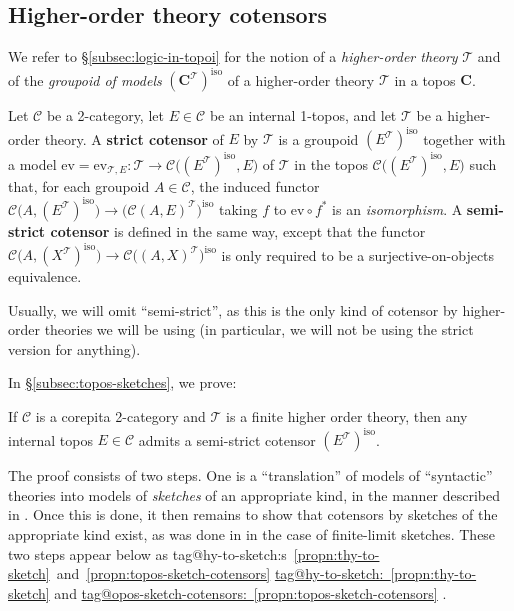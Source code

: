 \documentclass{amsart}
\makeatletter
\newcommand\bC{\mathbf{C}}
\newcommand\cC{\mathcal{C}}
\newcommand\cT{\mathcal{T}}
\newcommand\defword[1]{{\boldmath \textbf{#1}}}
\newcommand\ev{\mathrm{ev}}
\newcommand\iso{\mathrm{iso}}
\newcommand\pbig[1]{\big({#1}\big)}
\newcommand\tagword[1]{\csname tag@#1\endcsname}
\def\label@tag#1:#2\@nil{#1}
\newcommand\labeltag[1]{\label@tag#1:\@nil}
\newcommand\jref[1]{%
  \texorpdfstring%
    {\hyperref[#1]{\tagword{\labeltag{#1}}~\ref*{#1}}}%
    {\tagword{\labeltag{#1}}~\ref*{#1}}%
}
\newcommand\jrefs[2]{%
  \ifthenelse{\equal{\labeltag{#1}}{\labeltag{#2}}}%
  {%
    \texorpdfstring%
      {\tagword{\labeltag{#1}}s~\ref{#1}~and~\ref{#2}}%
      {\tagword{\labeltag{#1}}s~\ref*{#1}~and~\ref*{#2}}%
  }{\jref{#1} and \jref{#2}}%
}
\newcommand\prerefpost[3]{%
  \texorpdfstring%
    {\hyperref[#2]{#1\ref*{#2}#3}}%
    {#1\ref*{#2}#3}%
}
\newcommand\sref[1]{\prerefpost{\S}{#1}{}}
\theoremstyle{definition}
\theoremstyle{remark}
\theoremstyle{plainwithref}
\makeatother
\begin{document}
\subsection{Higher-order theory cotensors} \label{subsec:thy-cotensors}
We refer to \sref{subsec:logic-in-topoi} for the notion of a \emph{higher-order theory} \( \cT \) and of the \emph{groupoid of models} \( (\bC^\cT)^\iso \) of a higher-order theory \( \cT \) in a topos \( \bC \).

\begin{defn}
  Let \( \cC \) be a 2-category, let \( E \in \cC \) be an internal 1-topos, and let \( \cT \) be a higher-order theory.
  A \defword{strict cotensor} of \( E \) by \( \cT \) is a groupoid \( (E^\cT)^\iso \) together with a model \( \ev = \ev_{\cT,E} \colon \cT \to \cC\pbig{(E^{\cT})^\iso,E} \) of \( \cT \) in the topos \( \cC\pbig{(E^{\cT})^\iso,E} \) such that, for each groupoid \( A \in \cC \), the induced functor \( \cC\pbig{A,(E^{\cT})^\iso} \to \pbig{\cC(A,E)^{\cT}}^\iso \) taking \( f \) to \( \ev \circ f^* \) is an \emph{isomorphism}.
  A \defword{semi-strict cotensor} is defined in the same way, except that the functor \( \cC\pbig{A,(X^{\cT})^\iso} \to \cC\pbig{(A,X)^{\cT}}^\iso \) is only required to be a surjective-on-objects equivalence.
\end{defn}
Usually, we will omit ``semi-strict'', as this is the only kind of cotensor by higher-order theories we will be using (in particular, we will not be using the strict version for anything).

In \hyperref[proof:theory-cotensors]{\S\ref*{subsec:topos-sketches}}, we prove:
\begin{thm} \label{thm:theory-cotensors}
  If \( \cC \) is a corepita 2-category and \( \cT \) is a finite higher order theory, then any internal topos \( E \in \cC \) admits a semi-strict cotensor \( (E^{\cT})^\iso \).
\end{thm}
The proof consists of two steps.
One is a ``translation'' of models of ``syntactic'' theories into models of \emph{sketches} of an appropriate kind, in the manner described in \cite[\S9]{makkai-generalized-sketches-all}.
Once this is done, it then remains to show that cotensors by sketches of the appropriate kind exist, as was done in \cite[Appendix~A]{helfer-topoi-in-topoi} in the case of finite-limit sketches.
These two steps appear below as \jrefs{propn:thy-to-sketch}{propn:topos-sketch-cotensors}.
\end{document}
